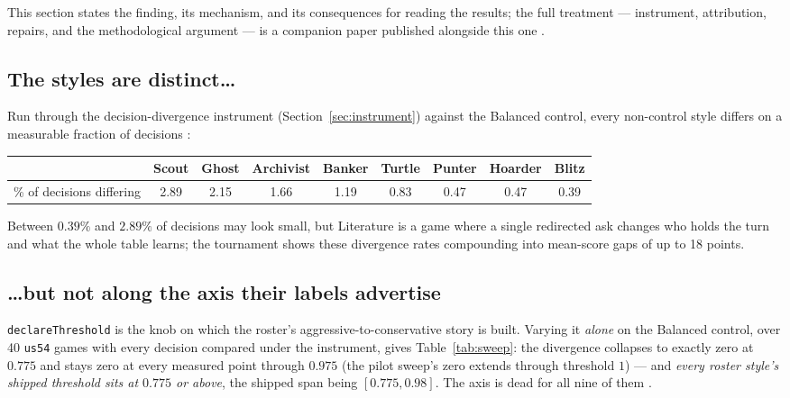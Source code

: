 \documentclass[11pt]{article}
\newcommand{\code}[1]{\texttt{#1}}
\newcommand{\usff}{\code{us54}}
\begin{document}
This section states the finding, its mechanism, and its consequences for reading the results;
the full treatment --- instrument, attribution, repairs, and the methodological argument --- is
a companion paper published alongside this one \cite{inertpaper}.

\subsection{The styles are distinct\ldots}
\label{sec:distinct}

Run through the decision-divergence instrument (Section~\ref{sec:instrument}) against the
Balanced control, every non-control style differs on a measurable fraction of decisions
\cite{styles}:

\begin{center}
\footnotesize
\begin{tabular}{@{}lcccccccc@{}}
\toprule
 & Scout & Ghost & Archivist & Banker & Turtle & Punter & Hoarder & Blitz \\
\midrule
\% of decisions differing & 2.89 & 2.15 & 1.66 & 1.19 & 0.83 & 0.47 & 0.47 & 0.39 \\
\bottomrule
\end{tabular}
\end{center}

\noindent
Between $0.39\%$ and $2.89\%$ of decisions may look small, but Literature is a game where a
single redirected ask changes who holds the turn and what the whole table learns; the
tournament shows these divergence rates compounding into mean-score gaps of up to 18 points.

\subsection{\ldots but not along the axis their labels advertise}

\code{declareThreshold} is the knob on which the roster's aggressive-to-conservative story is
built. Varying it \emph{alone} on the Balanced control, over 40 \usff{} games with every
decision compared under the instrument, gives Table~\ref{tab:sweep}: the divergence collapses
to exactly zero at $0.775$ and stays zero at every measured point through $0.975$ (the pilot
sweep's zero extends through threshold $1$) --- and \emph{every roster style's shipped
threshold sits at $0.775$ or above}, the shipped span being $[0.775, 0.98]$. The axis is dead
for all nine of them \cite{styles}.
\end{document}
